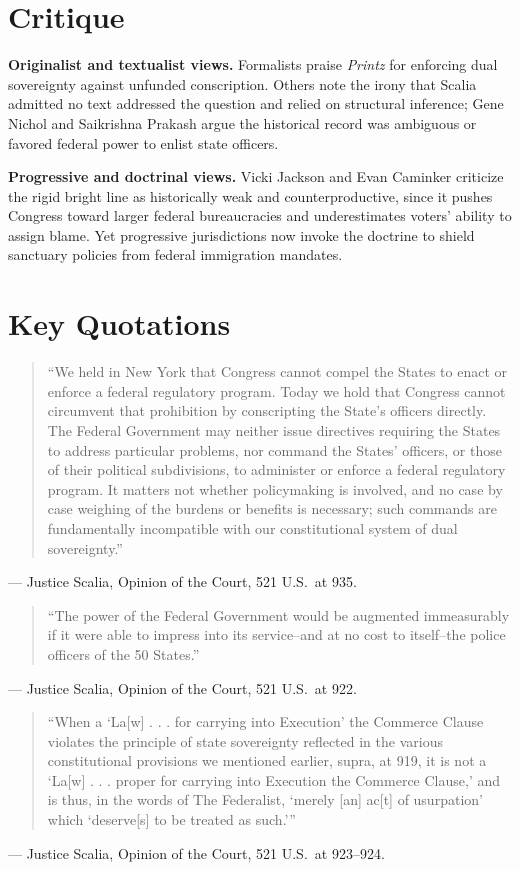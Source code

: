 \documentclass[12pt]{article}
\begin{document}
\section{Critique}

\textbf{Originalist and textualist views.} Formalists praise \textit{Printz} for enforcing dual sovereignty against unfunded conscription. Others note the irony that Scalia admitted no text addressed the question and relied on structural inference; Gene Nichol and Saikrishna Prakash argue the historical record was ambiguous or favored federal power to enlist state officers.

\textbf{Progressive and doctrinal views.} Vicki Jackson and Evan Caminker criticize the rigid bright line as historically weak and counterproductive, since it pushes Congress toward larger federal bureaucracies and underestimates voters' ability to assign blame. Yet progressive jurisdictions now invoke the doctrine to shield sanctuary policies from federal immigration mandates.

\section{Key Quotations}

\begin{quote}
``We held in New York that Congress cannot compel the States to enact or enforce a federal regulatory program. Today we hold that Congress cannot circumvent that prohibition by conscripting the State's officers directly. The Federal Government may neither issue directives requiring the States to address particular problems, nor command the States' officers, or those of their political subdivisions, to administer or enforce a federal regulatory program. It matters not whether policymaking is involved, and no case by case weighing of the burdens or benefits is necessary; such commands are fundamentally incompatible with our constitutional system of dual sovereignty.''
\end{quote}
\noindent --- Justice Scalia, Opinion of the Court, 521 U.S.\ at 935.

\begin{quote}
``The power of the Federal Government would be augmented immeasurably if it were able to impress into its service--and at no cost to itself--the police officers of the 50 States.''
\end{quote}
\noindent --- Justice Scalia, Opinion of the Court, 521 U.S.\ at 922.

\begin{quote}
``When a `La[w] . . . for carrying into Execution' the Commerce Clause violates the principle of state sovereignty reflected in the various constitutional provisions we mentioned earlier, supra, at 919, it is not a `La[w] . . . proper for carrying into Execution the Commerce Clause,' and is thus, in the words of The Federalist, `merely [an] ac[t] of usurpation' which `deserve[s] to be treated as such.'''
\end{quote}
\noindent --- Justice Scalia, Opinion of the Court, 521 U.S.\ at 923--924.
\end{document}
